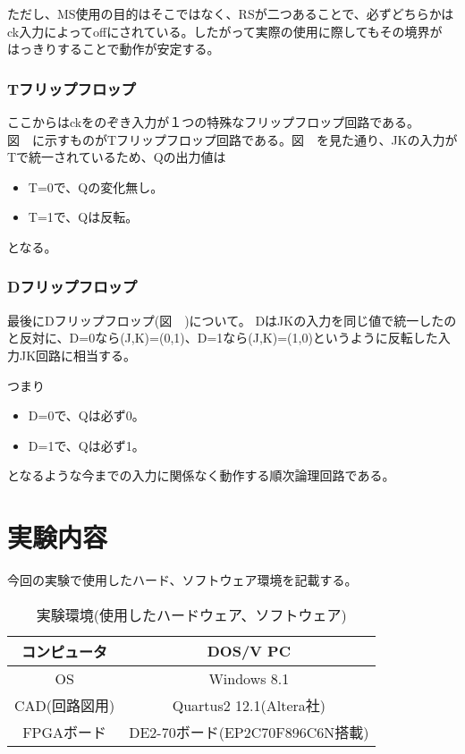 \documentclass[11pt,a4j]{jsarticle}
\begin{document}
  ただし、MS使用の目的はそこではなく、RSが二つあることで、必ずどちらかはck入力によってoffにされている。したがって実際の使用に際してもその境界が
  はっきりすることで動作が安定する。
  
  \newpage
  
  
  \subsubsection{Tフリップフロップ}
  ここからはckをのぞき入力が１つの特殊なフリップフロップ回路である。
  図\ \ に示すものがTフリップフロップ回路である。図\ \ を見た通り、JKの入力がTで統一されているため、Qの出力値は
  \begin{itemize}
   \item T=0で、Qの変化無し。
   \item T=1で、Qは反転。
  \end{itemize}
  となる。

  
  \subsubsection{Dフリップフロップ}
  最後にDフリップフロップ(図\ \ )について。
  DはJKの入力を同じ値で統一したのと反対に、D=0なら(J,K)=(0,1)、D=1なら(J,K)=(1,0)というように反転した入力JK回路に相当する。
  
  つまり
  \begin{itemize}
   \item D=0で、Qは必ず0。
   \item D=1で、Qは必ず1。
  \end{itemize}
  となるような今までの入力に関係なく動作する順次論理回路である。
  
 \newpage
  
  
 \section{実験内容}
  今回の実験で使用したハード、ソフトウェア環境を記載する。
   \begin{table}[htb]
  \begin{center}
    \caption{実験環境(使用したハードウェア、ソフトウェア)}
     \begin{tabular}{|c|c|} \hline
コンピュータ & DOS/V PC \\ \hline
OS & Windows 8.1 \\ \hline
CAD(回路図用) & Quartus2 12.1(Altera社) \\ \hline
FPGAボード & DE2-70ボード(EP2C70F896C6N搭載) \\ \hline
    \end{tabular}
    \label{tab:price}
  \end{center}
   \end{table}
   
\end{document}
